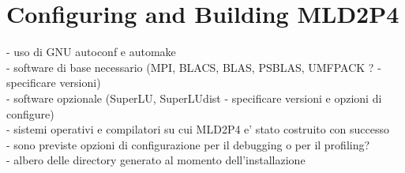 \section{Configuring and Building MLD2P4\label{sec:configuring}}
    - uso di GNU autoconf e automake \\
    - software di base necessario (MPI, BLACS, BLAS, PSBLAS, UMFPACK ? - specificare versioni)\\
    - software opzionale (SuperLU, SuperLUdist - specificare versioni e opzioni di configure)\\
    - sistemi operativi e compilatori su cui MLD2P4 e' stato costruito con successo \\
    - sono previste opzioni di configurazione per il debugging o per il profiling? \\
    - albero delle directory generato al momento dell'installazione\\
